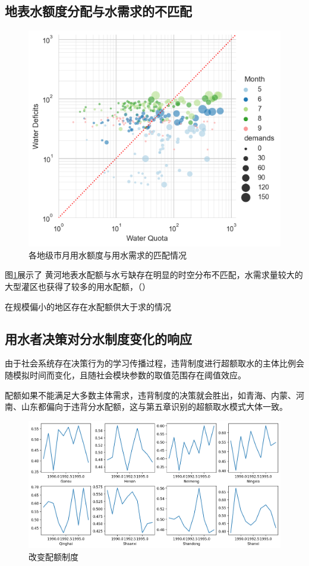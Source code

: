 
\subsection{地表水额度分配与水需求的不匹配}

\begin{figure}[htb]
    \centering
    \includegraphics[width=\textwidth]{img/ch6/ch6_matches.png}
    \caption{各地级市月用水额度与用水需求的匹配情况}\label{ch6:fig:matches}
\end{figure}

图\ref{ch6:fig:matches}展示了
黄河地表水配额与水亏缺存在明显的时空分布不匹配，水需求量较大的大型灌区也获得了较多的用水配额，（）

在规模偏小的地区存在水配额供大于求的情况


\subsection{用水者决策对分水制度变化的响应}

由于社会系统存在决策行为的学习传播过程，违背制度进行超额取水的主体比例会随模拟时间而变化，且随社会模块参数的取值范围存在阈值效应。

配额如果不能满足大多数主体需求，违背制度的决策就会胜出，如青海、内蒙、河南、山东都偏向于违背分水配额，这与第五章识别的超额取水模式大体一致。

\begin{figure}[htb]
    \centering
    \includegraphics[width=\textwidth]{img/ch6/ch6_threshold.png}
    \caption{改变配额制度}\label{fig:xfig0}
\end{figure}

